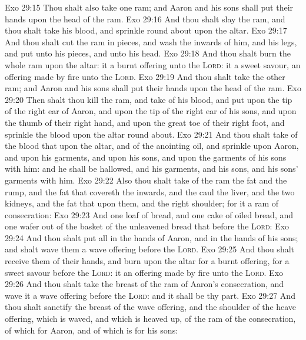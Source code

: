 \vs Exo 29:15 Thou shalt also take one ram; and Aaron and his sons shall put their hands upon the head of the ram.
\vs Exo 29:16 And thou shalt slay the ram, and thou shalt take his blood, and sprinkle  round about upon the altar.
\vs Exo 29:17 And thou shalt cut the ram in pieces, and wash the inwards of him, and his legs, and put  unto his pieces, and unto his head.
\vs Exo 29:18 And thou shalt burn the whole ram upon the altar: it  a burnt offering unto the \textsc{Lord}: it  a sweet savour, an offering made by fire unto the \textsc{Lord}.
\vs Exo 29:19 And thou shalt take the other ram; and Aaron and his sons shall put their hands upon the head of the ram.
\vs Exo 29:20 Then shalt thou kill the ram, and take of his blood, and put  upon the tip of the right ear of Aaron, and upon the tip of the right ear of his sons, and upon the thumb of their right hand, and upon the great toe of their right foot, and sprinkle the blood upon the altar round about.
\vs Exo 29:21 And thou shalt take of the blood that  upon the altar, and of the anointing oil, and sprinkle  upon Aaron, and upon his garments, and upon his sons, and upon the garments of his sons with him: and he shall be hallowed, and his garments, and his sons, and his sons' garments with him.
\vs Exo 29:22 Also thou shalt take of the ram the fat and the rump, and the fat that covereth the inwards, and the caul  the liver, and the two kidneys, and the fat that  upon them, and the right shoulder; for it  a ram of consecration:
\vs Exo 29:23 And one loaf of bread, and one cake of oiled bread, and one wafer out of the basket of the unleavened bread that  before the \textsc{Lord}:
\vs Exo 29:24 And thou shalt put all in the hands of Aaron, and in the hands of his sons; and shalt wave them  a wave offering before the \textsc{Lord}.
\vs Exo 29:25 And thou shalt receive them of their hands, and burn  upon the altar for a burnt offering, for a sweet savour before the \textsc{Lord}: it  an offering made by fire unto the \textsc{Lord}.
\vs Exo 29:26 And thou shalt take the breast of the ram of Aaron's consecration, and wave it  a wave offering before the \textsc{Lord}: and it shall be thy part.
\vs Exo 29:27 And thou shalt sanctify the breast of the wave offering, and the shoulder of the heave offering, which is waved, and which is heaved up, of the ram of the consecration,  of  which  for Aaron, and of  which is for his sons:
